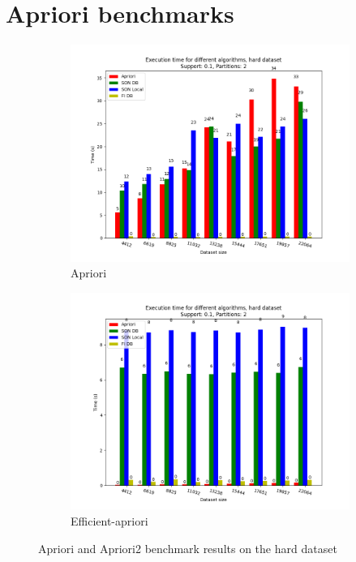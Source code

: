 \documentclass[a4paper]{article}
\begin{document}
	
		

	

	\appendix 

	\section{Apriori benchmarks}

	\begin{figure}[h]
		\centering
		\begin{subfigure}[b]{0.49\textwidth}
			\centering
			\includegraphics[width=\textwidth]{hard_aprioribenchmark.png}
         	\caption{Apriori}
		\end{subfigure}
		\hfill		
		\begin{subfigure}[b]{0.49\textwidth}
			\centering
			\includegraphics[width=\textwidth]{hard_apriori2benchmark.png}
         	\caption{Efficient-apriori}
		\end{subfigure}
		\hfill
		\caption{Apriori and Apriori2 benchmark results on the hard dataset}
		\label{fig:aprioribenchmark-h}
	\end{figure}
\end{document}
